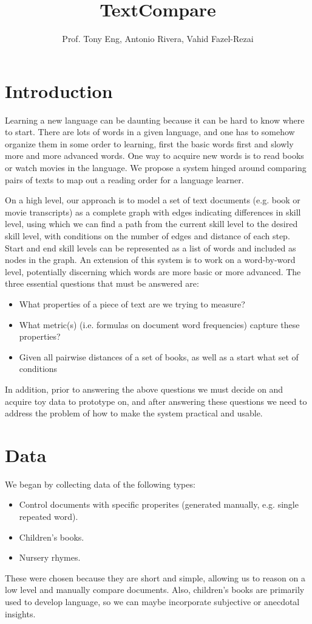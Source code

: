 \documentclass[11pt]{paper}
\title{TextCompare}
\author{Prof. Tony Eng, Antonio Rivera, Vahid Fazel-Rezai}
\begin{document}
\maketitle

\section{Introduction}

Learning a new language can be daunting because it can be hard to know where to start. There are lots of words in a given language, and one has to somehow organize them in some order to learning, first the basic words first and slowly more and more advanced words. One way to acquire new words is to read books or watch movies in the language. We propose a system hinged around comparing pairs of texts to map out a reading order for a language learner. 

On a high level, our approach is to model a set of text documents (e.g. book or movie transcripts) as a complete graph with edges indicating differences in skill level, using which we can find a path from the current skill level to the desired skill level, with conditions on the number of edges and distance of each step. Start and end skill levels can be represented as a list of words and included as nodes in the graph. An extension of this system is to work on a word-by-word level, potentially discerning which words are more basic or more advanced. The three essential questions that must be answered are:
\begin{itemize}
  \item What properties of a piece of text are we trying to measure?
  \item What metric(s) (i.e. formulas on document word frequencies) capture these properties?
  \item Given all pairwise distances of a set of books, as well as a start what set of conditions 
\end{itemize}
In addition, prior to answering the above questions we must decide on and acquire toy data to prototype on, and after answering these questions we need to address the problem of how to make the system practical and usable.

\section{Data}

We began by collecting data of the following types:
\begin{itemize}
  \item Control documents with specific properites (generated manually, e.g. single repeated word).
  \item Children's books.
  \item Nursery rhymes.
\end{itemize}
These were chosen because they are short and simple, allowing us to reason on a low level and manually compare documents. Also, children's books are primarily used to develop language, so we can maybe incorporate subjective or anecdotal insights.
\end{document}
